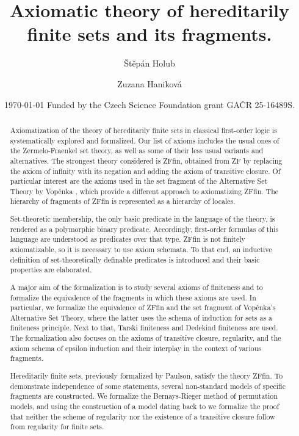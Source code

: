 \documentclass[11pt,a4paper]{report}
\begin{document}
\title{Axiomatic theory of hereditarily finite sets and its fragments.}
\author{Štěpán Holub \and Zuzana Haniková}
  

 \date{ \today
 \vfill
  Funded by the Czech Science Foundation grant GA\v CR 25-16489S.}
  
\maketitle

\begin{abstract}
Axiomatization of the theory of hereditarily finite sets in classical first-order logic is systematically explored and formalized.
Our list of axioms includes the usual ones of the Zermelo-Fraenkel set theory, as well as some of their less usual variants and alternatives.
The strongest theory considered is ZFfin, obtained from ZF by replacing the axiom of infinity with its negation and adding the axiom of transitive closure.
Of particular interest are the axioms used in the set fragment of the Alternative Set Theory by Vopěnka \cite{Vopenka1979,Sochor1979,Sochor1982,Sochor1983}, which provide a different approach to axiomatizing ZFfin. The hierarchy of fragments of ZFfin is represented as a hierarchy of locales.

Set-theoretic membership, the only basic predicate in the language of the theory, is rendered as a polymorphic binary predicate. Accordingly, first-order formulas of this language are understood as predicates over that type.  ZFfin is not finitely axiomatizable, so it is necessary to use axiom schemata. To that end, an inductive definition of set-theoretically definable predicates is introduced and their basic properties are elaborated.

A major aim of the formalization is to study  several axioms of finiteness and to formalize the equivalence of the fragments in which these axioms are used.
In particular, we formalize the equivalence of ZFfin and the set fragment of Vopěnka's Alternative Set Theory, where the latter uses the schema of induction for sets as a finiteness principle.
Next to that, Tarski finiteness and Dedekind finiteness are used.
The formalization also focuses on the axioms of transitive closure, regularity, and the axiom schema of epsilon induction and their interplay in the context of various fragments.

Hereditarily finite sets, previously formalized by Paulson, satisfy the theory ZFfin.
To demonstrate independence of some statements, several non-standard models of specific fragments are constructed.
We formalize the Bernays-Rieger method of permutation models, and using the construction of a model dating back to \cite{Rieger1957} we formalize the proof that neither the scheme of regularity nor the existence of a transitive closure follow from regularity for finite sets.


\end{abstract}
\end{document}
